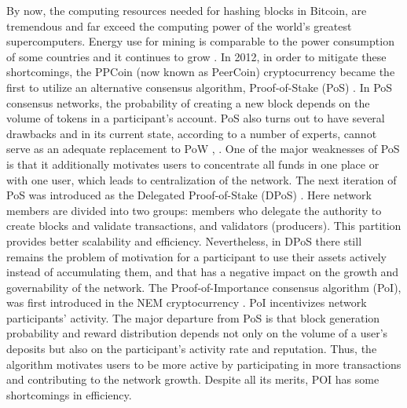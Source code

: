\documentclass[a4paper,12pt]{article}
\begin{document}

By now, the computing resources needed for hashing blocks in Bitcoin, are tremendous and far exceed the computing power of the world’s greatest supercomputers. Energy use for mining is comparable to the power consumption of some countries and it continues to grow \cite{energy}. In 2012, in order to mitigate these shortcomings, the PPCoin (now known as PeerCoin)  cryptocurrency became the first to utilize an alternative consensus algorithm, Proof-of-Stake (PoS) \cite{Ppcoin}. In PoS consensus networks, the probability of creating a new block depends on the volume of tokens in a participant’s account. PoS also turns out to have several drawbacks and in its current state, according to a number of experts, cannot serve as an adequate replacement to PoW \cite{Demeester}, \cite{Poelstra}. One of the major weaknesses of PoS is that it additionally motivates users to concentrate all funds in one place or with one user, which leads to centralization of the network. The next iteration of PoS was introduced as the Delegated Proof-of-Stake (DPoS) \cite{dantheman}. Here network members are divided into two groups: members who delegate the authority to create blocks and validate transactions, and validators (producers). This partition provides better scalability and efficiency. Nevertheless, in DPoS there still remains the problem of motivation for a participant to use their assets actively instead of accumulating them, and that has a negative impact on the growth and governability of the network. The Proof-of-Importance consensus algorithm (PoI), was first introduced in the NEM cryptocurrency \cite{nem}. PoI incentivizes network participants' activity. The major departure from PoS is that block generation probability and reward distribution depends not only on the volume of a user's deposits but also on the participant's activity rate and reputation. Thus, the algorithm motivates users to be more active by participating in  more transactions and contributing to the network growth. Despite all its merits, POI has some shortcomings in efficiency. 
\end{document}
